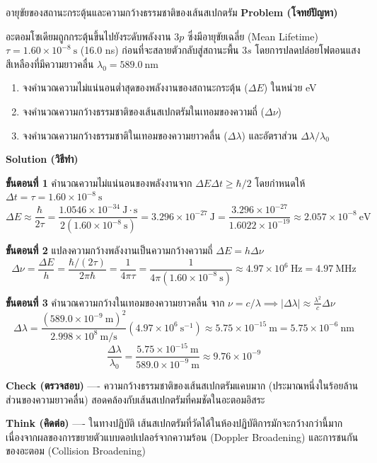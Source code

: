 \begin{psctbox}{อายุขัยของสถานะกระตุ้นและความกว้างธรรมชาติของเส้นสเปกตรัม}
\textbf{Problem (โจทย์ปัญหา)}

อะตอมโซเดียมถูกกระตุ้นขึ้นไปยังระดับพลังงาน $3p$ ซึ่งมีอายุขัยเฉลี่ย (Mean Lifetime) $\tau = 1.60 \times 10^{-8}~\text{s}$ (16.0 ns) ก่อนที่จะสลายตัวกลับสู่สถานะพื้น $3s$ โดยการปลดปล่อยโฟตอนแสงสีเหลืองที่มีความยาวคลื่น $\lambda_0 = 589.0~\text{nm}$
\begin{enumerate}
    \item จงคำนวณความไม่แน่นอนต่ำสุดของพลังงานของสถานะกระตุ้น ($\Delta E$) ในหน่วย eV
    \item จงคำนวณความกว้างธรรมชาติของเส้นสเปกตรัมในเทอมของความถี่ ($\Delta \nu$)
    \item จงคำนวณความกว้างธรรมชาติในเทอมของความยาวคลื่น ($\Delta \lambda$) และอัตราส่วน $\Delta \lambda / \lambda_0$
\end{enumerate}

\textbf{Solution (วิธีทำ)}

\textbf{ขั้นตอนที่ 1} คำนวณความไม่แน่นอนของพลังงานจาก $\Delta E \Delta t \ge \hbar/2$
โดยกำหนดให้ $\Delta t = \tau = 1.60 \times 10^{-8}~\text{s}$
\begin{equation*}
\Delta E \approx \frac{\hbar}{2\tau} = \frac{1.0546 \times 10^{-34}~\text{J}\cdot\text{s}}{2(1.60 \times 10^{-8}~\text{s})} = 3.296 \times 10^{-27}~\text{J} = \frac{3.296 \times 10^{-27}}{1.6022 \times 10^{-19}} \approx 2.057 \times 10^{-8}~\text{eV}
\end{equation*}

\textbf{ขั้นตอนที่ 2} แปลงความกว้างพลังงานเป็นความกว้างความถี่ $\Delta E = h \Delta \nu$
\begin{equation*}
\Delta \nu = \frac{\Delta E}{h} = \frac{\hbar / (2\tau)}{2\pi\hbar} = \frac{1}{4\pi\tau} = \frac{1}{4\pi(1.60 \times 10^{-8}~\text{s})} \approx 4.97 \times 10^6~\text{Hz} = 4.97~\text{MHz}
\end{equation*}

\textbf{ขั้นตอนที่ 3} คำนวณความกว้างในเทอมของความยาวคลื่น จาก $\nu = c/\lambda \implies |\Delta\lambda| \approx \frac{\lambda^2}{c}\Delta\nu$
\begin{equation*}
\Delta \lambda = \frac{(589.0 \times 10^{-9}~\text{m})^2}{2.998 \times 10^8~\text{m/s}}(4.97 \times 10^6~\text{s}^{-1}) \approx 5.75 \times 10^{-15}~\text{m} = 5.75 \times 10^{-6}~\text{nm}
\end{equation*}
\begin{equation*}
\frac{\Delta \lambda}{\lambda_0} = \frac{5.75 \times 10^{-15}~\text{m}}{589.0 \times 10^{-9}~\text{m}} \approx 9.76 \times 10^{-9}
\end{equation*}

\textbf{Check (ตรวจสอบ)} ---- ความกว้างธรรมชาติของเส้นสเปกตรัมแคบมาก (ประมาณหนึ่งในร้อยล้านส่วนของความยาวคลื่น) สอดคล้องกับเส้นสเปกตรัมที่คมชัดในอะตอมอิสระ

\textbf{Think (คิดต่อ)} ---- ในทางปฏิบัติ เส้นสเปกตรัมที่วัดได้ในห้องปฏิบัติการมักจะกว้างกว่านี้มาก เนื่องจากผลของการขยายตัวแบบดอปเปลอร์จากความร้อน (Doppler Broadening) และการชนกันของอะตอม (Collision Broadening)
\end{psctbox}

